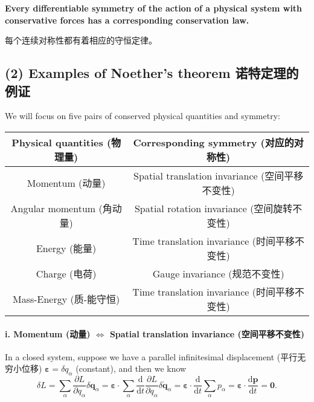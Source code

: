 \textbf{Every differentiable symmetry of the action of a physical system
with conservative forces has a corresponding conservation law.}

每个连续对称性都有着相应的守恒定律。

\subsection*{(2) Examples of Noether's theorem
诺特定理的例证}\label{examples-of-noethers-theorem-ux8bfaux7279ux5b9aux7406ux7684ux4f8bux8bc1}

We will focus on five pairs of conserved physical quantities and
symmetry:

\begin{center}
    \begin{tabular}{|c|c|}
        \hline
        \textbf{Physical quantities (物理量)} & \textbf{Corresponding symmetry (对应的对称性)} \\
        \hline
        Momentum (动量) & Spatial translation invariance (空间平移不变性) \\
        \hline
        Angular momentum (角动量) & Spatial rotation invariance (空间旋转不变性) \\
        \hline
        Energy (能量) & Time translation invariance (时间平移不变性) \\
        \hline
        Charge (电荷) & Gauge invariance (规范不变性) \\
        \hline
        Mass-Energy (质-能守恒) & Time translation invariance (时间平移不变性) \\
        \hline
    \end{tabular}
\end{center}

\paragraph{i. Momentum (动量) \(\Leftrightarrow\) Spatial
translation invariance
(空间平移不变性)}\label{momentum-ux52a8ux91cf-leftrightarrow-spatial-translation-invariance-ux7a7aux95f4ux5e73ux79fbux4e0dux53d8ux6027}

In a closed system, suppose we have a parallel infinitesimal
displacement (平行无穷小位移)
\(\boldsymbol{\varepsilon} = \delta q_\alpha\) (constant), and then we
know
\[\delta L = \sum_{\alpha} \frac{\partial L}{\partial q_\alpha} \delta \boldsymbol{q}_\alpha = \boldsymbol{\varepsilon} \cdot \sum_{\alpha} \frac{\mathrm{d}}{\mathrm{d}t} \frac{\partial L}{\partial q_\alpha} \delta \dot{\boldsymbol{q}}_\alpha = \boldsymbol{\varepsilon} \cdot \frac{\mathrm{d}}{\mathrm{d}t} \sum_{\alpha} p_\alpha = \boldsymbol{\varepsilon} \cdot \frac{\mathrm{d} \boldsymbol{p}}{\mathrm{d}t} = \boldsymbol{0}.\]


